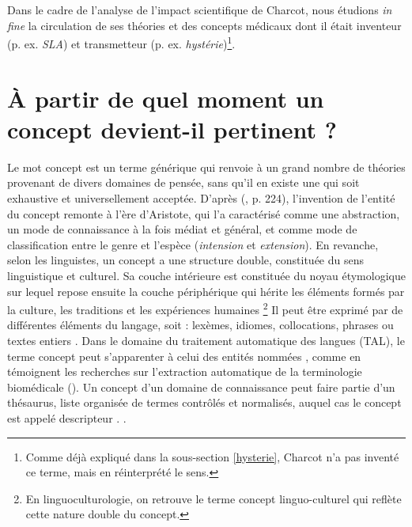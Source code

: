 Dans le cadre de l'analyse de l'impact scientifique de Charcot, nous étudions \textit{in fine} la circulation de ses théories et des concepts médicaux dont il était inventeur (p. ex. \textit{SLA}) et transmetteur (p. ex. \textit{hystérie})\footnote{Comme déjà expliqué dans la sous-section \ref{hysterie}, Charcot n'a pas inventé ce terme, mais en réinterprété le sens.}. 

\section{À partir de quel moment un concept devient-il pertinent ?}
\label{concept}

Le mot \og{}concept\fg{} est un terme générique qui renvoie à un grand nombre de théories provenant de divers domaines de pensée, sans qu'il en existe une qui soit exhaustive et universellement acceptée. D'après \citeauthor{Lecourt1999} (\citeyear{Lecourt1999}, p. 224), l'invention de l'entité du concept remonte à l'ère d'Aristote, qui l'a caractérisé comme une abstraction, un mode de connaissance à la fois médiat et général, et comme mode de classification entre le genre et l'espèce (\textit{intension} et \textit{extension}). En revanche, selon les linguistes, un concept a une structure double, constituée du sens linguistique et culturel.
Sa couche intérieure est constituée du noyau étymologique sur lequel repose ensuite la couche périphérique qui hérite les éléments formés par la culture, les traditions et les expériences humaines 
\footnote{En linguoculturologie, on retrouve le terme \og{}concept linguo-culturel\fg{} qui reflète cette nature double du concept.} Il peut être exprimé par de différentes éléments du langage, soit : lexèmes, idiomes, collocations, phrases ou textes entiers \citep[p.~5]{nemickiene2011concept}. Dans le domaine du traitement automatique des langues (\textsc{TAL}), le terme \og concept \fg{} peut s'apparenter à celui des \og entités nommées \fg{}, comme en témoignent les recherches sur l'extraction automatique de la terminologie biomédicale (\citealp{jolly2024exploring,navarro2023clinical}). Un concept d'un domaine de connaissance peut faire partie d'un thésaurus, liste organisée de termes contrôlés et normalisés, auquel cas le concept est appelé \og descripteur \fg{}. \citep[p.~16]{RENNESSON202015}.



